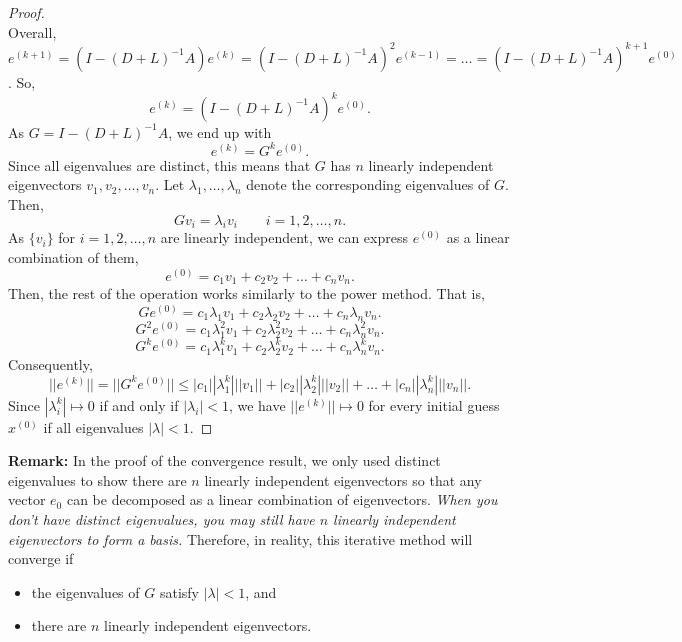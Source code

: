 \documentclass[letterpaper]{article}
\newcommand{\0}{\mathbf{0}}
\begin{document}
\begin{proof}
\begin{equation*}
    \end{equation*}
    Overall, $e^{(k + 1)} = (I - (D + L)^{-1}A)e^{(k)} = (I - (D + L)^{-1}A)^2 e^{(k - 1)} = \hdots = (I - (D + L)^{-1}A)^{k + 1} e^{(0)}$. So, \[e^{(k)} = (I - (D + L)^{-1} A)^k e^{(0)}.\] As $G = I - (D + L)^{-1} A$, we end up with \[e^{(k)} = G^k e^{(0)}.\] Since all eigenvalues are distinct, this means that $G$ has $n$ linearly independent eigenvectors $v_1, v_2, \hdots, v_n$. Let $\lambda_1, \hdots, \lambda_n$ denote the corresponding eigenvalues of $G$. Then, 
    \[Gv_i = \lambda_i v_i \qquad i = 1, 2, \hdots, n.\]
    As $\{v_i\}$ for $i = 1, 2, \hdots, n$ are linearly independent, we can express $e^{(0)}$ as a linear combination of them, 
    \[e^{(0)} = c_1 v_1 + c_2 v_2 + \hdots + c_n v_n.\]
    Then, the rest of the operation works similarly to the power method. That is, 
    \[Ge^{(0)} = c_1 \lambda_1 v_1 + c_2 \lambda_2 v_2 + \hdots + c_n \lambda_n v_n.\]
    \[G^2 e^{(0)} = c_1 \lambda_1^2 v_1 + c_2 \lambda_2^2 v_2 + \hdots + c_n \lambda_n^2 v_n.\]
    \[G^k e^{(0)} = c_1 \lambda_1^k v_1 + c_2 \lambda_2^k v_2 + \hdots + c_n \lambda_n^k v_n.\]
    Consequently, 
    \[||e^{(k)}|| = ||G^k e^{(0)}|| \leq |c_1| |\lambda_1^k| ||v_1|| + |c_2| |\lambda_2^k| ||v_2|| + \hdots + |c_n| |\lambda_n^k| ||v_n||.\]
    Since $|\lambda_i^k| \mapsto 0$ if and only if $|\lambda_i| < 1$, we have $||e^{(k)}|| \mapsto 0$ for every initial guess $x^{(0)}$ if all eigenvalues $|\lambda| < 1$. 
\end{proof}
\textbf{Remark:} In the proof of the convergence result, we only used distinct eigenvalues to show there are $n$ linearly independent eigenvectors so that any vector $e_0$ can be decomposed as a linear combination of eigenvectors. \emph{When you don't have distinct eigenvalues, you may still have $n$ linearly independent eigenvectors to form a basis.} Therefore, in reality, this iterative method will converge if
\begin{itemize}
    \item the eigenvalues of $G$ satisfy $|\lambda| < 1$, and 
    \item there are $n$ linearly independent eigenvectors. 
\end{itemize}
\end{document}
